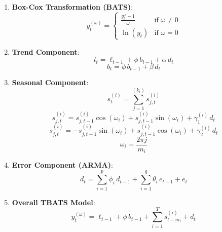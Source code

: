 \documentclass[conference]{IEEEtran}
\begin{document}
\begin{enumerate}
    \item \textbf{Box-Cox Transformation (BATS)}:
    \[
    y_{t}^{(\omega)} = \begin{cases} 
    \frac{y_t^\omega - 1}{\omega} & \text{if } \omega \neq 0 \\
    \ln(y_t) & \text{if } \omega = 0 
    \end{cases}
    \]
    \item \textbf{Trend Component}:
    \[
    l_{t} = \ell_{t-1} + \phi \, b_{t-1} + \alpha \, d_{t}  
    \]
    \[
    b_{t} = \phi \, b_{t-1} + \beta \, d_{t}
    \]
    \item \textbf{Seasonal Component}:
    \[
    s_{t}^{(i)} = \sum_{j=1}^{(k_i)} s_{j,t}^{(i)}
    \]
    \[
    s_{j,t}^{(i)} = s_{j,t-1}^{(i)} \cos \left( \omega_i \right) + s_{j,t-1}^{(i)} \sin \left( \omega_i \right) + \gamma_{1}^{(i)} \, d_{t}
    \]
    \[
    s_{j,t}^{(i)} = - s_{j,t-1}^{(i)} \sin \left( \omega_i \right) + s_{j,t-1}^{(i)} \cos \left( \omega_i \right) + \gamma_{2}^{(i)} \, d_{t}
    \]
    \[
    \omega_i = \frac{2 \pi j}{m_i}
    \]
    \item \textbf{Error Component (ARMA)}:
    \[
    d_{t} = \sum_{i=1}^{p} \phi_{i} \, d_{t-1} + \sum_{i=1}^{q} \theta_{i} \, e_{t-1} + e_{t}
    \]
    \item \textbf{Overall TBATS Model}:
    \[
    y_{t}^{(\omega)} = \ell_{t-1} + \phi \, b_{t-1} + \sum_{i=1}^{T} s_{t - m_i}^{(i)} + d_t
    \]


\end{enumerate}
\end{document}
